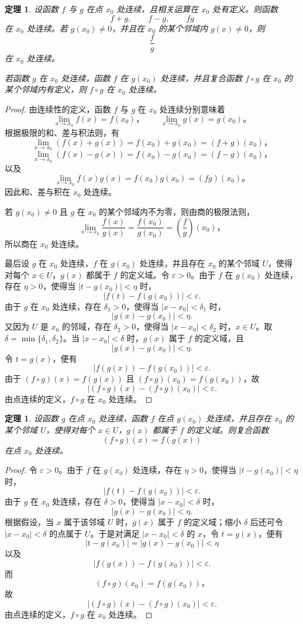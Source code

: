 \documentclass[UTF8,fontset=fandol,11pt]{ctexart}
\newtheorem{theorem}[definition]{定理}
\begin{document}
\begin{theorem}
设函数 $f$ 与 $g$ 在点 $x_0$ 处连续，且相关运算在 $x_0$ 处有定义。则函数
\[
f+g,
\qquad f-g,
\qquad fg
\]
在 $x_0$ 处连续。若 $g(x_0)\neq0$，并且在 $x_0$ 的某个邻域内 $g(x)\neq0$，则
\[
\frac{f}{g}
\]
在 $x_0$ 处连续。

若函数 $g$ 在 $x_0$ 处连续，函数 $f$ 在 $g(x_0)$ 处连续，并且复合函数 $f\circ g$ 在 $x_0$ 的某个邻域内有定义，则 $f\circ g$ 在 $x_0$ 处连续。\label{thm:continuity-algebra}
\end{theorem}
\begin{proof}
由连续性的定义，函数 $f$ 与 $g$ 在 $x_0$ 处连续分别意味着
\[
\lim_{x\to x_0}f(x)=f(x_0)\text{，}
\qquad
\lim_{x\to x_0}g(x)=g(x_0)\text{。}
\]
根据极限的和、差与积法则，有
\[
\lim_{x\to x_0}(f(x)+g(x))=f(x_0)+g(x_0)=(f+g)(x_0)\text{，}
\]
\[
\lim_{x\to x_0}(f(x)-g(x))=f(x_0)-g(x_0)=(f-g)(x_0)\text{，}
\]
以及
\[
\lim_{x\to x_0}f(x)g(x)=f(x_0)g(x_0)=(fg)(x_0)\text{。}
\]
因此和、差与积在 $x_0$ 处连续。

若 $g(x_0)\neq0$ 且 $g$ 在 $x_0$ 的某个邻域内不为零，则由商的极限法则，
\[
\lim_{x\to x_0}\frac{f(x)}{g(x)}
=\frac{f(x_0)}{g(x_0)}
=\left(\frac{f}{g}\right)(x_0)\text{，}
\]
所以商在 $x_0$ 处连续。

最后设 $g$ 在 $x_0$ 处连续，$f$ 在 $g(x_0)$ 处连续，并且存在 $x_0$ 的某个邻域 $U$，使得对每个 $x\in U$，$g(x)$ 都属于 $f$ 的定义域。令 $\varepsilon>0$。由于 $f$ 在 $g(x_0)$ 处连续，存在 $\eta>0$，使得当 $|t-g(x_0)|<\eta$ 时，
\[
|f(t)-f(g(x_0))|<\varepsilon.
\]
由于 $g$ 在 $x_0$ 处连续，存在 $\delta_1>0$，使得当 $|x-x_0|<\delta_1$ 时，
\[
|g(x)-g(x_0)|<\eta.
\]
又因为 $U$ 是 $x_0$ 的邻域，存在 $\delta_2>0$，使得当 $|x-x_0|<\delta_2$ 时，$x\in U$。取 $\delta=\min\{\delta_1,\delta_2\}$。当 $|x-x_0|<\delta$ 时，$g(x)$ 属于 $f$ 的定义域，且
\[
|g(x)-g(x_0)|<\eta.
\]
令 $t=g(x)$，便有
\[
|f(g(x))-f(g(x_0))|<\varepsilon.
\]
由于 $(f\circ g)(x)=f(g(x))$ 且 $(f\circ g)(x_0)=f(g(x_0))$，故
\[
|(f\circ g)(x)-(f\circ g)(x_0)|<\varepsilon.
\]
由点连续的定义，$f\circ g$ 在 $x_0$ 处连续。
\end{proof}
\begin{theorem}
设函数 $g$ 在点 $x_0$ 处连续，函数 $f$ 在点 $g(x_0)$ 处连续，并且存在 $x_0$ 的某个邻域 $U$，使得对每个 $x\in U$，$g(x)$ 都属于 $f$ 的定义域。则复合函数
\[
(f\circ g)(x)=f(g(x))
\]
在点 $x_0$ 处连续。\label{thm:composition-continuity}
\end{theorem}
\begin{proof}
令 $\varepsilon>0$。由于 $f$ 在 $g(x_0)$ 处连续，存在 $\eta>0$，使得当 $|t-g(x_0)|<\eta$ 时，
\[
|f(t)-f(g(x_0))|<\varepsilon.
\]
由于 $g$ 在 $x_0$ 处连续，存在 $\delta>0$，使得当 $|x-x_0|<\delta$ 时，
\[
|g(x)-g(x_0)|<\eta.
\]
根据假设，当 $x$ 属于该邻域 $U$ 时，$g(x)$ 属于 $f$ 的定义域；缩小 $\delta$ 后还可令 $|x-x_0|<\delta$ 的点属于 $U$。于是对满足 $|x-x_0|<\delta$ 的 $x$，令 $t=g(x)$，便有
\[
|t-g(x_0)|=|g(x)-g(x_0)|<\eta
\]
以及
\[
|f(g(x))-f(g(x_0))|<\varepsilon.
\]
而
\[
(f\circ g)(x_0)=f(g(x_0))\text{，}
\]
故
\[
|(f\circ g)(x)-(f\circ g)(x_0)|<\varepsilon.
\]
由点连续的定义，$f\circ g$ 在 $x_0$ 处连续。
\end{proof}
\end{document}
